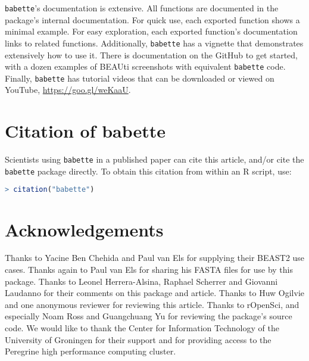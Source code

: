 \documentclass{article}
\begin{document}
\verb;babette;'s documentation is extensive. All functions are documented
in the package's internal documentation. For quick use, 
each exported function shows a minimal example. 
For easy exploration, each exported function's documentation links to related functions.
Additionally, \verb;babette; has a vignette that demonstrates extensively how
to use it. There is documentation on the GitHub to get started, 
with a dozen examples of BEAUti screenshots with equivalent \verb;babette; code.
Finally, \verb;babette; has tutorial videos that can 
be downloaded or viewed on YouTube, \url{https://goo.gl/weKaaU}.

\section{Citation of babette}

Scientists using \verb;babette; in a published paper can cite this
article, and/or cite the \verb;babette; package 
directly. To obtain this citation from within an R script, use:

\begin{lstlisting}[language=R]
> citation("babette")
\end{lstlisting}

\section{Acknowledgements}

Thanks to Yacine Ben Chehida and Paul van Els for supplying their 
BEAST2 use cases. Thanks again to Paul van Els for sharing his FASTA files 
for use by this package. Thanks to Leonel Herrera-Alsina, Raphael Scherrer 
and Giovanni Laudanno for their comments on this package and article.
Thanks to Huw Ogilvie and one anonymous reviewer for reviewing this article.
Thanks to rOpenSci, and especially Noam Ross and Guangchuang Yu for reviewing the package's source code.
We would like to thank the Center for Information Technology of the University 
of Groningen for their support and for providing access to the Peregrine 
high performance computing cluster.

\end{document}
